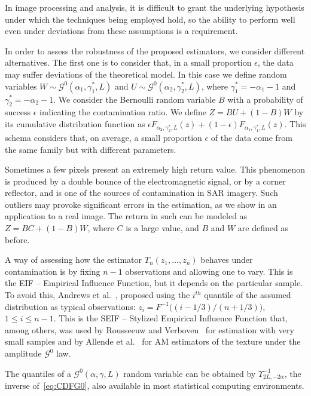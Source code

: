 \documentclass[twocolumn]{svjour3}
\begin{document}
	In image processing and analysis, it is difficult to grant the underlying hypothesis under which the techniques being employed hold, so the ability to perform well even under deviations from these assumptions is a requirement.
	
	In order to assess the robustness of the proposed estimators, we consider different alternatives. 
	The first one is to consider that, in a small proportion $\epsilon$, the data may suffer deviations of the theoretical model. 
	In this case we define random variables $W \sim \mathcal{G}^0(\alpha_1,\gamma_1^*,L)$ and $U \sim \mathcal{G}^0(\alpha_2,\gamma_2^*,L)$, where $\gamma_1^*=-\alpha_1-1$ and  $\gamma_2^*=-\alpha_2-1$. 
	We consider the Bernoulli random variable $B$ with a probability of success $\epsilon$ indicating the contamination ratio.   
	We define $Z=BU+(1-B)W$ by its cumulative distribution function as
	$
	\epsilon {F}_{\alpha_2,\gamma_2^*,L}(z)+(1-\epsilon) {F}_{\alpha_1,\gamma_1^*,L}(z)
	$.
	This schema considers that, on average, a small proportion $\epsilon$ of the data come from the same family but with different parameters. 
	
	Sometimes a few pixels present an extremely high return value. 
	This phenomenon is produced by a double bounce of the electromagnetic signal, or by a corner reflector, and is one of the sources of contamination in SAR imagery. 
	Such outliers may provoke significant errors in the estimation, as we show in an application to a real image. 
	The return in such can be modeled as $Z=BC+(1-B)W$, where $C$ is a large value, and $B$ and $W$ are defined as before.
	
	A way of assessing how the estimator $T_n(z_1,\dots,z_n)$ behaves under contamination is by fixing $n-1$ observations and allowing one to vary.
	This is the EIF -- Empirical Influence Function, but it depends on the particular sample.
	To avoid this, Andrews et al.~\cite{Andrews1972}, proposed using the $i^{th}$ quantile of the assumed distribution as typical observations: $z_i=F^{-1}\big((i-1/3)/(n+1/3) \big)$, $1\leq i\leq n-1$.
	This is the SEIF -- Stylized Empirical Influence Function that, among others, was used by Rousseeuw and Verboven~\cite{RousseeuwCSDA} for estimation with very small samples and by Allende et al.~\cite{AllendeFreryetal:JSCS:05} for AM estimators of the texture under the amplitude $\mathcal G^0$ law.
	
	The quantiles of a $\mathcal G^0(\alpha,\gamma,L)$ random variable can be obtained by $\Upsilon^{-1}_{2L,-2\alpha}$, the inverse of~\eqref{eq:CDFG0}, also available in most statistical computing environments.
	
\end{document}
